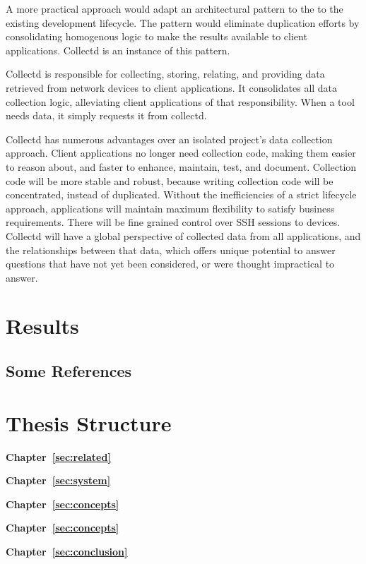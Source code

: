 A more practical approach would adapt an architectural pattern to the to the 
existing development lifecycle. The pattern would eliminate duplication
efforts by consolidating homogenous logic to make the results available to
client applications. Collectd is an instance of this pattern. 

Collectd is responsible for collecting, storing, relating, and providing data retrieved 
from network devices to client applications. It consolidates all data 
collection logic, alleviating client applications of that responsibility.
When a tool needs data, it simply requests it from collectd. 

Collectd has numerous advantages over an isolated project's data collection approach. 
Client applications no longer need collection code, making them easier to reason
about, and faster to enhance, maintain, test, and document. Collection code will
be more stable and robust, because writing collection code will be concentrated,
instead of duplicated. Without the inefficiencies of a strict lifecycle approach, 
applications will maintain maximum flexibility to satisfy business requirements.
There will be fine grained control over SSH sessions to devices. Collectd will
have a global perspective of collected data from all applications, and the 
relationships between that data, which offers unique potential to answer 
questions that have not yet been considered, or were thought impractical to 
answer.
\Blindtext[3][1]~\cite{Jurgens:2000,Jurgens:1995,Miede:2011,Kohm:2011,Apple:keynote:2010,Apple:numbers:2010,Apple:pages:2010}

\section{Results}
\label{sec:intro:results}

\Blindtext[1][2]

\subsection{Some References}
\label{sec:intro:results:refs}
\cite{WEB:GNU:GPL:2010,WEB:Miede:2011}

\section{Thesis Structure}
\label{sec:intro:structure}

\textbf{Chapter~\ref{sec:related}} \\[0.2em]
\blindtext{}

\textbf{Chapter~\ref{sec:system}} \\[0.2em]
\blindtext{}

\textbf{Chapter~\ref{sec:concepts}} \\[0.2em]
\blindtext{}

\textbf{Chapter~\ref{sec:concepts}} \\[0.2em]
\blindtext{}

\textbf{Chapter~\ref{sec:conclusion}} \\[0.2em]
\blindtext{}
